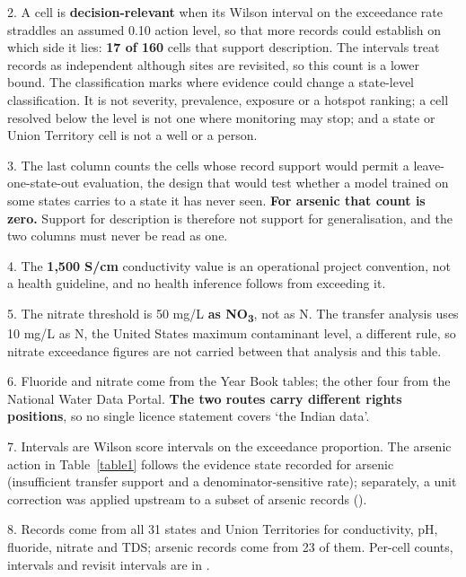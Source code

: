 \documentclass[10pt,letterpaper]{article}
\begin{document}
\begin{table}[!ht]
{\begin{flushleft}
2. A cell is \textbf{decision-relevant} when its Wilson interval on the exceedance rate straddles an assumed 0.10 action level, so that more records could establish on which side it lies: \textbf{17 of 160} cells that support description. The intervals treat records as independent although sites are revisited, so this count is a lower bound. The classification marks where evidence could change a state-level classification. It is not severity, prevalence, exposure or a hotspot ranking; a cell resolved below the level is not one where monitoring may stop; and a state or Union Territory cell is not a well or a person.

3. The last column counts the cells whose record support would permit a leave-one-state-out evaluation, the design that would test whether a model trained on some states carries to a state it has never seen. \textbf{For arsenic that count is zero.} Support for description is therefore not support for generalisation, and the two columns must never be read as one.

4. The \textbf{1,500 \textmu{}S/cm} conductivity value is an operational project convention, not a health guideline, and no health inference follows from exceeding it.

5. The nitrate threshold is 50 mg/L \textbf{as NO\textsubscript{3}}, not as N. The transfer analysis uses 10 mg/L as N, the United States maximum contaminant level, a different rule, so nitrate exceedance figures are not carried between that analysis and this table.

6. Fluoride and nitrate come from the Year Book tables; the other four from the National Water Data Portal. \textbf{The two routes carry different rights positions}, so no single licence statement covers `the Indian data'.

7. Intervals are Wilson score intervals on the exceedance proportion. The arsenic action in Table~\ref{table1} follows the evidence state recorded for arsenic (insufficient transfer support and a denominator-sensitive rate); separately, a unit correction was applied upstream to a subset of arsenic records ().

8. Records come from all 31 states and Union Territories for conductivity, pH, fluoride, nitrate and TDS; arsenic records come from 23 of them. Per-cell counts, intervals and revisit intervals are in .
\end{flushleft}
}
\label{table2}
\end{table}
\end{document}
